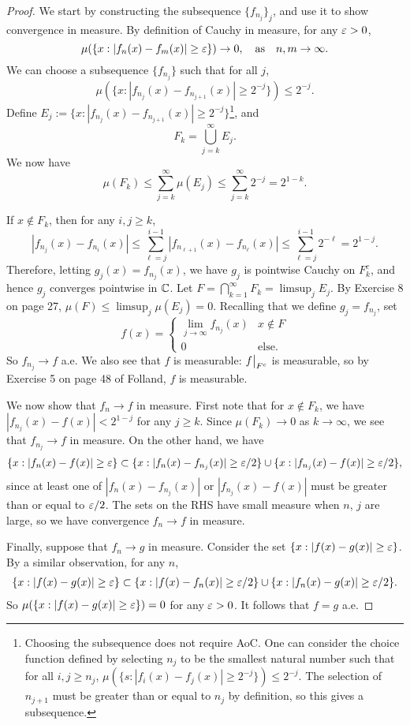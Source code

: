 \documentclass[12pt]{article} %
\begin{document}
\begin{proof}
    We start by constructing the subsequence $\{f_{n_j}\}_j$, and use it to show convergence in measure.
    By definition of Cauchy in measure, for any $\varepsilon > 0$, \[\mu(\{x : |f_n(x) - f_m(x)| \geq \varepsilon \}) \to 0, \ \ \ \text{as} \ \ \ n,m \to \infty.\] We can choose a subsequence $\{f_{n_j}\}$ such that for all $j$, \[\mu(\{x : |f_{n_j}(x) - f_{n_{j+1}}(x)| \geq 2^{-j} \}) \leq 2^{-j}.\] Define $E_j := \{x : |f_{n_j}(x) - f_{n_{j+1}}(x)| \geq 2^{-j} \}$\footnote{Choosing the subsequence does not require AoC. One can consider the choice function defined by selecting $n_j$ to be the smallest natural number such that for all $i,j \geq n_j$, $\mu\left(\{s : |f_i(x) - f_j(x)| \geq 2^{-j} \} \right) \leq 2^{-j}$. The selection of $n_{j+1}$ must be greater than or equal to $n_j$ by definition, so this gives a subsequence.}, and \[F_k = \bigcup_{j=k}^{\infty} E_j.\] We now have \[\mu(F_k) \leq \sum_{j=k}^{\infty} \mu(E_j) \leq \sum_{j=k}^{\infty} 2^{-j} = 2^{1-k}.\]

    If $x \notin F_k$, then for any $i, j \geq k$, \[|f_{n_j}(x) - f_{n_{i}}(x)| \leq \sum_{\ell = j}^{i-1} |f_{n_{\ell + 1}}(x) - f_{n_\ell}(x)| \leq \sum_{\ell = j}^{i-1} 2^{-\ell} = 2^{1-j}.\] Therefore, letting $g_j(x) = f_{n_j}(x)$, we have $g_j$ is pointwise Cauchy on $F_k^c$, and hence $g_j$ converges pointwise in $\mathbb{C}$. Let $F = \bigcap_{k=1}^{\infty} F_k = \limsup_j E_j$. By Exercise 8 on page 27, $\mu(F) \leq \limsup_j \mu(E_j) = 0$. Recalling that we define $g_j = f_{n_j}$, set \[f(x) = \begin{cases}
        \lim_{j \to \infty} f_{n_j}(x) &x \not\in F\\
        0 &\text{else}.
    \end{cases}\]
    So $f_{n_j} \to f$ a.e. We also see that $f$ is measurable: $\restr{f}{F^c}$ is measurable, so by Exercise 5 on page 48 of Folland, $f$ is measurable.

    We now show that $f_n \to f$ in measure. First note that for $x \not\in F_k$, we have $|f_{n_j}(x) - f(x)| < 2^{1-j}$ for any $j \geq k$. Since $\mu(F_k) \to 0$ as $k \to \infty$, we see that $f_{n_j} \to f$ in measure. On the other hand, we have \begin{align*}
        \{x : |f_n(x) - f(x)| \geq \varepsilon\} \subset \{x : |f_n(x) - f_{n_j}(x)| \geq \varepsilon/2\} \cup \{x : |f_{n_j}(x) - f(x)| \geq \varepsilon / 2\},
    \end{align*} since at least one of $|f_n(x) - f_{n_j}(x)|$ or $|f_{n_j}(x) - f(x)|$ must be greater than or equal to $\varepsilon / 2$. The sets on the RHS have small measure when $n$, $j$ are large, so we have convergence $f_n \to f$ in measure.

    Finally, suppose that $f_n \to g$ in measure. Consider the set $\{x : |f(x) - g(x)| \geq \varepsilon\}$. By a similar observation, for any $n$, \begin{align*}
        \{x : |f(x) - g(x)| \geq \varepsilon\} \subset \{x : |f(x) - f_{n}(x)| \geq \varepsilon/2\} \cup \{x : |f_{n}(x) - g(x)| \geq \varepsilon / 2\}.
    \end{align*} So $\mu(\{x : |f(x) - g(x)| \geq \varepsilon \}) = 0$ for any $\varepsilon > 0$. It follows that $f = g$ a.e.
\end{proof}
\end{document}
